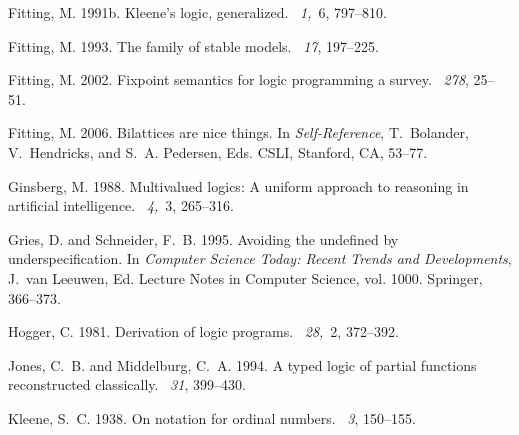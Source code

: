 \documentclass{tlp}
\begin{document}
\begin{thebibliography}{}
{\sc Fitting, M.} 1991b.
\newblock Kleene's logic, generalized.
~{\em 1,\/}~6, 797--810.

{\sc Fitting, M.} 1993.
\newblock The family of stable models.
~{\em 17}, 197--225.

{\sc Fitting, M.} 2002.
\newblock Fixpoint semantics for logic programming a survey.
~{\em 278}, 25--51.

{\sc Fitting, M.} 2006.
\newblock Bilattices are nice things.
\newblock In {\em Self-Reference}, {T.~Bolander}, {V.~Hendricks}, {and} {S.~A.
  Pedersen}, Eds. CSLI, Stanford, CA, 53--77.

{\sc Ginsberg, M.} 1988.
\newblock Multivalued logics: A uniform approach to reasoning in artificial
  intelligence.
~{\em 4,\/}~3, 265--316.

{\sc Gries, D.} {\sc and} {\sc Schneider, F.~B.} 1995.
\newblock Avoiding the undefined by underspecification.
\newblock In {\em Computer Science Today: Recent Trends and Developments},
  {J.~{van Leeuwen}}, Ed. Lecture Notes in Computer Science, vol. 1000.
  Springer, 366--373.

{\sc Hogger, C.} 1981.
\newblock Derivation of logic programs.
~{\em 28,\/}~2, 372--392.

{\sc Jones, C.~B.} {\sc and} {\sc Middelburg, C.~A.} 1994.
\newblock A typed logic of partial functions reconstructed classically.
~{\em 31}, 399--430.

{\sc Kleene, S.~C.} 1938.
\newblock On notation for ordinal numbers.
~{\em 3}, 150--155.


\end{thebibliography}
\end{document}
